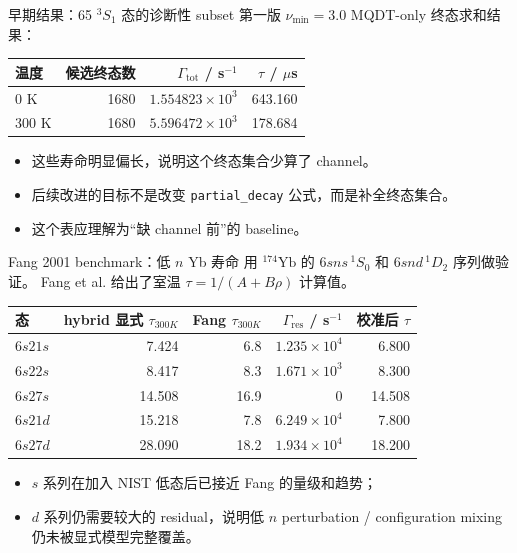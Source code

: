 \documentclass[aspectratio=169,11pt]{ctexbeamer}
\begin{document}
\begin{frame}{早期结果：65 \({}^3S_1\) 态的诊断性 subset}
  第一版 \(\nu_{\min}=3.0\) MQDT-only 终态求和结果：
  \begin{table}
    \centering
    \begin{tabular}{lrrr}
      \toprule
      温度 & 候选终态数 & \(\Gamma_{\mathrm{tot}}\) / s\(^{-1}\) & \(\tau\) / \(\mu\)s \\
      \midrule
      0 K & 1680 & \(1.554823\times 10^3\) & 643.160 \\
      300 K & 1680 & \(5.596472\times 10^3\) & 178.684 \\
      \bottomrule
    \end{tabular}
  \end{table}

  \begin{itemize}
    \item 这些寿命明显偏长，说明这个终态集合少算了 channel。
    \item 后续改进的目标不是改变 \texttt{partial\_decay} 公式，而是补全终态集合。
    \item 这个表应理解为“缺 channel 前”的 baseline。
  \end{itemize}
\end{frame}

\begin{frame}{Fang 2001 benchmark：低 \(n\) Yb 寿命}
  用 \({}^{174}\mathrm{Yb}\) 的 \(6sns\,{}^1S_0\) 和 \(6snd\,{}^1D_2\) 序列做验证。
  Fang et al. 给出了室温 \(\tau=1/(A+B\rho)\) 计算值。

  \begin{table}
    \centering
    \scriptsize
    \begin{tabular}{lrrrr}
      \toprule
      态 & hybrid 显式 \(\tau_{300K}\) & Fang \(\tau_{300K}\) & \(\Gamma_{\mathrm{res}}\) / s\(^{-1}\) & 校准后 \(\tau\) \\
      \midrule
      \(6s21s\) & 7.424 & 6.8 & \(1.235\times10^4\) & 6.800 \\
      \(6s22s\) & 8.417 & 8.3 & \(1.671\times10^3\) & 8.300 \\
      \(6s27s\) & 14.508 & 16.9 & 0 & 14.508 \\
      \(6s21d\) & 15.218 & 7.8 & \(6.249\times10^4\) & 7.800 \\
      \(6s27d\) & 28.090 & 18.2 & \(1.934\times10^4\) & 18.200 \\
      \bottomrule
    \end{tabular}
  \end{table}

  \begin{itemize}
    \item \(s\) 系列在加入 NIST 低态后已接近 Fang 的量级和趋势；
    \item \(d\) 系列仍需要较大的 residual，说明低 \(n\) perturbation / configuration mixing 仍未被显式模型完整覆盖。
  \end{itemize}
\end{frame}
\end{document}
